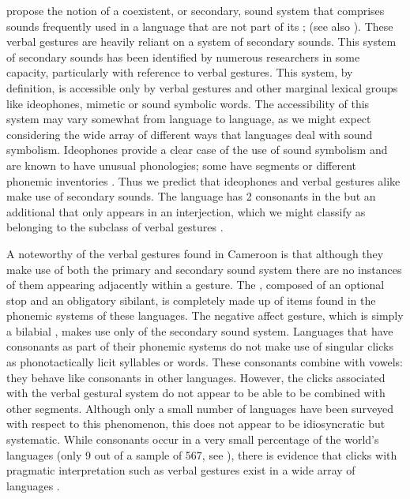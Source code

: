 \documentclass[output=paper
,newtxmath
,modfonts
,nonflat]{langsci/langscibook}
\begin{document}
\citet{friespike} propose the notion of a coexistent, or secondary, sound system that comprises sounds frequently used in a language that are not part of its ; (see also \citealt{harris1951}). These verbal gestures are heavily reliant on a system of secondary sounds. This system of secondary sounds has been identified by numerous researchers in some capacity, particularly with reference to verbal gestures. This system, by definition, is accessible only by verbal gestures and other marginal lexical groups like ideophones, mimetic or sound symbolic words. The accessibility of this system may vary somewhat from language to language, as we might expect considering the wide array of different ways that languages deal with sound symbolism. Ideophones provide a clear case of the use of sound symbolism and are known to have unusual phonologies; some have segments or different phonemic inventories \citet[181-185]{childs1994}.  Thus we predict that ideophones and verbal gestures alike make use of secondary sounds. The  language  has 2  consonants in the  but an additional   that only appears in an interjection, which we might classify as belonging to the subclass of verbal gestures \citep[130]{BostoenSands2012}.

A noteworthy  of the verbal gestures found in Cameroon is that although they make use of both the primary and secondary sound system there are no instances of them appearing adjacently within a gesture. The , composed of an optional stop and an obligatory sibilant, is completely made up of items found in the phonemic systems of these languages. The negative affect gesture, which is simply a bilabial , makes use only of the secondary sound system. Languages that have  consonants as part of their phonemic systems do not make use of singular clicks as phonotactically licit syllables or words. These consonants combine with vowels: they behave like consonants in other languages. However, the clicks associated with the verbal gestural system do not appear to be able to be combined with other segments. Although only a small number of languages have been surveyed with respect to this phenomenon, this does not appear to be idiosyncratic but systematic. While  consonants occur in a very small percentage of the world's languages (only 9 out of a sample of 567, see \citealt{wals-19}), there is evidence that clicks with pragmatic interpretation such as verbal gestures exist in a wide array of languages \citep{wals-142}. %
\end{document}
